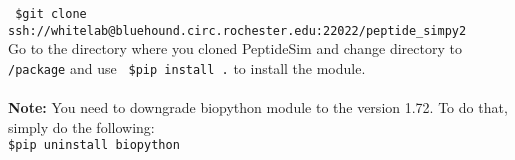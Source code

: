 \documentclass [12pt] {article}
\begin{document}
{\color{blue} \texttt{  \$git clone ssh://whitelab@bluehound.circ.rochester.edu:22022/peptide\_simpy2 }}
\\Go to the directory where you cloned PeptideSim and change directory to \texttt{/package} and use  {\color{blue} \texttt{  \$pip install .}} to install the module.
\\\\
\textbf{Note:} You need to downgrade biopython module to the version 1.72. To do that, simply do the following:\\

 {\color{blue} \texttt{\$pip uninstall biopython}} 
\\ 
\end{document}
